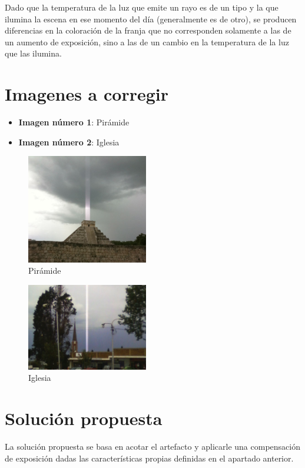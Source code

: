 \documentclass[11pt]{article}
\providecommand{\tightlist}{%
      \setlength{\itemsep}{0pt}\setlength{\parskip}{0pt}}
\begin{document}
Dado que la temperatura de la luz que emite un rayo es de un tipo y la
que ilumina la escena en ese momento del día (generalmente es de otro),
se producen diferencias en la coloración de la franja que no
corresponden solamente a las de un aumento de exposición, sino a las de
un cambio en la temperatura de la luz que las ilumina.

\hypertarget{imagenes-a-corregir}{%
\section{Imagenes a corregir}\label{imagenes-a-corregir}}

\begin{itemize}
\tightlist
\item
  \textbf{Imagen número 1}: Pirámide
\item
  \textbf{Imagen número 2}: Iglesia
\end{itemize}

\begin{figure}
	\includegraphics[width=200px]{imagenes/piramide.png}
	\caption{Pirámide}
\end{figure}
\begin{figure}
	\includegraphics[width=200px]{imagenes/iglesia.png}
	\caption{Iglesia}
\end{figure}

    \hypertarget{soluciuxf3n-propuesta}{%
\section{Solución propuesta}\label{soluciuxf3n-propuesta}}

La solución propuesta se basa en acotar el artefacto y aplicarle una
compensación de exposición dadas las características propias definidas
en el apartado anterior.
\end{document}
